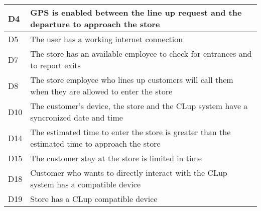 \begin{center}
{\begin{longtable}{L{2cm}L{12cm}}
            \hline
             D4 & GPS is enabled between the line up request and the departure to approach the store \\
            \hline
             D5 & The user has a working internet connection \\
            \hline
             D7 & The store has an available employee to check for entrances and to report exits \\
            \hline
             D8 & The store employee who lines up customers will call them when they are allowed to enter the store \\
            \hline
             D10 & The customer’s device, the store and the CLup system have a syncronized date and time \\
            \hline
             D14 & The estimated time to enter the store is greater than the estimated time to approach the store \\
            \hline
             D15 & The customer stay at the store is limited in time \\
            \hline
             D18 & Customer who wants to directly interact with the CLup system has a compatible device \\
            \hline
             D19 & Store has a CLup compatible device \\
            \hline
        \end{longtable}}


\end{center}
